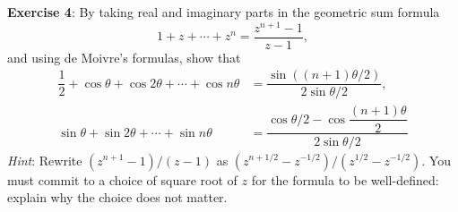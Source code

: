 \documentclass{article}
\begin{document}
\textbf{Exercise 4}: By taking real and imaginary parts in the geometric sum formula
    \begin{equation*}
        1 + z + \cdots + z^{n} = \dfrac{z^{n + 1} - 1}{z - 1},
    \end{equation*}
and using de Moivre's formulas, show that 
    \begin{align*}
        \dfrac{1}{2} + \cos{\theta} + \cos{2\theta} + \cdots + \cos{n\theta} &= \dfrac{\sin{((n + 1)\theta/2)}}{2\sin{\theta/2}},                          \\
        \sin{\theta} + \sin{2\theta} + \cdots + \sin{n\theta}                &= \dfrac{\cos{\theta/2} - \cos{\dfrac{(n + 1)\theta}{2}}}{2 \sin{\theta/2}}   
    \end{align*}
\textit{Hint}: Rewrite $(z^{n + 1} - 1)/(z - 1)$ as $(z^{n + 1/2} - z^{-1/2})/(z^{1/2} - z^{-1/2})$. You must commit to a choice of square root of $z$ for the formula to be well-defined: explain why the choice does not matter.
\end{document}
